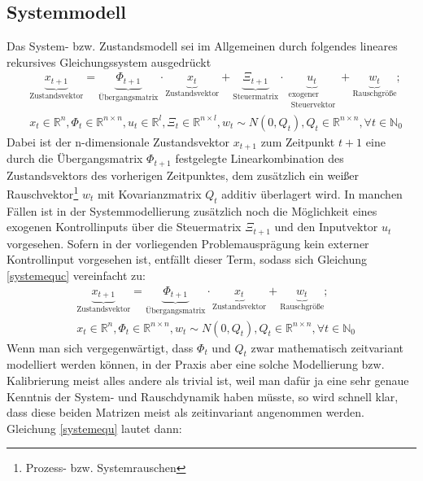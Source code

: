 \documentclass[12pt,a4paper,headsepline,bibliography=totoc,listof=totoc,headinclude=false,footinclude=false,BCOR5mm]{scrreprt} %
\begin{document}
\subsection{Systemmodell}
Das System- bzw. Zustandsmodell sei im Allgemeinen \cite[S. 10]{Sorenson1970}\cite[S. 38ff]{Kalman1960} durch folgendes lineares rekursives Gleichungssystem ausgedr\"uckt
\begin{equation}\label{systemequc} \begin{split} & \underbrace{x_{t+1}}_{\text{Zustandsvektor}} = \underbrace{\Phi_{t+1}}_{\text{\"Ubergangsmatrix}} \cdot \underbrace{x_{t}}_{\text{Zustandsvektor}}+\underbrace{\Xi_{t+1}}_{\text{Steuermatrix}}\cdot\underbrace{u_{t}}_{\substack{\text{exogener} \\ \text{ Steuervektor}}}+\underbrace{w_{t}}_{\text{Rauschgr\"o{\ss}e}};  \\&  x_t \in \mathbb{R}^{n}, \Phi_t \in \mathbb{R}^{n \times n}, u_t \in \mathbb{R}^{l}, \Xi_t \in \mathbb{R}^{n \times l}, w_t \sim N(0,Q_t), Q_t \in \mathbb{R}^{n \times n}, \forall t \in \mathbb{N}_{0}
\end{split} \end{equation}
Dabei ist der n-dimensionale Zustandsvektor $x_{t+1}$ zum Zeitpunkt $t+1$ eine durch die Übergangs\-matrix $\Phi_{t+1}$ festgelegte Linearkombination des Zustandsvektors des vorherigen Zeitpunktes, dem zus{\"a}tzlich ein wei{\ss}er Rauschvektor\footnote{Prozess- bzw. Systemrauschen} $w_t$ mit Kovarianzmatrix $Q_t$ additiv {\"u}berlagert wird. In manchen F\"allen ist in der Systemmodellierung zus{\"a}tzlich noch die M{\"o}glichkeit eines exogenen Kontrollinputs {\"u}ber die Steuermatrix $\Xi_{t+1}$ und den Inputvektor $u_t$ vorgesehen. Sofern in der vorliegenden Problemauspr{\"a}gung kein externer Kontrollinput vorgesehen ist, entf{\"a}llt dieser Term, sodass sich Gleichung \ref{systemequc} vereinfacht zu:
 \begin{equation}\label{systemequ} \begin{split} & \underbrace{x_{t+1}}_{\text{Zustandsvektor}} = \underbrace{\Phi_{t+1}}_{\text{\"Ubergangsmatrix}} \cdot \underbrace{x_{t}}_{\text{Zustandsvektor}}+\underbrace{w_{t}}_{\text{Rauschgr\"o{\ss}e}};  \\&  x_t \in \mathbb{R}^{n}, \Phi_t \in \mathbb{R}^{n \times n}, w_t \sim N(0,Q_t), Q_t \in \mathbb{R}^{n \times n}, \forall t \in \mathbb{N}_{0}
\end{split} \end{equation}
Wenn man sich vergegenw{\"a}rtigt, dass $\Phi_t$ und  $Q_t$ zwar mathematisch zeitvariant modelliert werden k{\"o}nnen,  in der Praxis aber eine solche Modellierung bzw. Kalibrierung meist alles andere als trivial ist, weil man daf{\"u}r ja eine sehr genaue Kenntnis der System- und Rauschdynamik haben m{\"u}sste, so wird schnell klar, dass diese beiden Matrizen meist als zeitinvariant angenommen werden. Gleichung \ref{systemequ} lautet dann:
\end{document}
